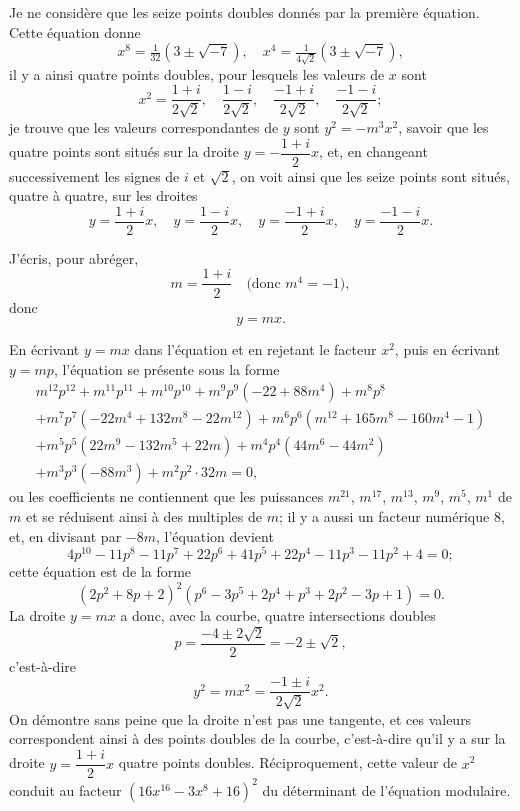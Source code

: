 \documentclass[11pt,a4paper]{article}
\begin{document}
Je ne consid\`ere que les seize points doubles donn\'es par la premi\`ere \'equation. Cette \'equation donne
\[
x^8 = \tfrac{1}{32}(3 \pm \sqrt{-7}),\quad x^4 = \tfrac{1}{4\sqrt{2}}(3 \pm \sqrt{-7}),
\]
il y a ainsi quatre points doubles, pour lesquels les valeurs de $x$ sont
\[
x^2 = \frac{1 + i}{2\sqrt{2}},\quad \frac{1 - i}{2\sqrt{2}},\quad \frac{-1 + i}{2\sqrt{2}},\quad \frac{-1 - i}{2\sqrt{2}};
\]
je trouve que les valeurs correspondantes de $y$ sont $y^2 = -m^3x^2$, savoir que les quatre points sont situ\'es sur la droite $y = -\dfrac{1+i}{2}x$, et, en changeant successivement les signes de $i$ et $\sqrt{2}$, on voit ainsi que les seize points sont situ\'es, quatre \`a quatre, sur les droites
\[
y = \frac{1+i}{2}x,\quad y = \frac{1-i}{2}x,\quad y = \frac{-1+i}{2}x,\quad y = \frac{-1-i}{2}x.
\]

J'\'ecris, pour abr\'eger,
\[
m = \frac{1+i}{2}\quad \text{(donc } m^4 = -1\text{)},
\]
donc
\[
y = mx.
\]

En \'ecrivant $y = mx$ dans l'\'equation et en rejetant le facteur $x^2$, puis en \'ecrivant $y = mp$, l'\'equation se pr\'esente sous la forme
\begin{multline*}
m^{12}p^{12} + m^{11}p^{11} + m^{10}p^{10} + m^9p^9(-22 + 88m^4) + m^8p^8 \\
+ m^7p^7(-22m^4 + 132m^8 - 22m^{12}) + m^6p^6(m^{12} + 165m^8 - 160m^4 - 1) \\
+ m^5p^5(22m^9 - 132m^5 + 22m) + m^4p^4(44m^6 - 44m^2) \\
+ m^3p^3(-88m^3) + m^2p^2 \cdot 32m = 0,
\end{multline*}
ou les coefficients ne contiennent que les puissances $m^{21}$, $m^{17}$, $m^{13}$, $m^9$, $m^5$, $m^1$ de $m$ et se r\'eduisent ainsi \`a des multiples de $m$; il y a aussi un facteur num\'erique 8, et, en divisant par $-8m$, l'\'equation devient
\[
4p^{10} - 11p^8 - 11p^7 + 22p^6 + 41p^5 + 22p^4 - 11p^3 - 11p^2 + 4 = 0;
\]
cette \'equation est de la forme
\[
(2p^2 + 8p + 2)^2(p^6 - 3p^5 + 2p^4 + p^3 + 2p^2 - 3p + 1) = 0.
\]
La droite $y = mx$ a donc, avec la courbe, quatre intersections doubles
\[
p = \frac{-4 \pm 2\sqrt{2}}{2} = -2 \pm \sqrt{2},
\]
c'est-\`a-dire
\[
y^2 = mx^2 = \frac{-1 \pm i}{2\sqrt{2}}x^2.
\]
On d\'emontre sans peine que la droite n'est pas une tangente, et ces valeurs correspondent ainsi \`a des points doubles de la courbe, c'est-\`a-dire qu'il y a sur la droite $y = \dfrac{1+i}{2}x$ quatre points doubles. R\'eciproquement, cette valeur de $x^2$ conduit au facteur $(16x^{16} - 3x^8 + 16)^2$ du d\'eterminant de l'\'equation modulaire.
\end{document}
